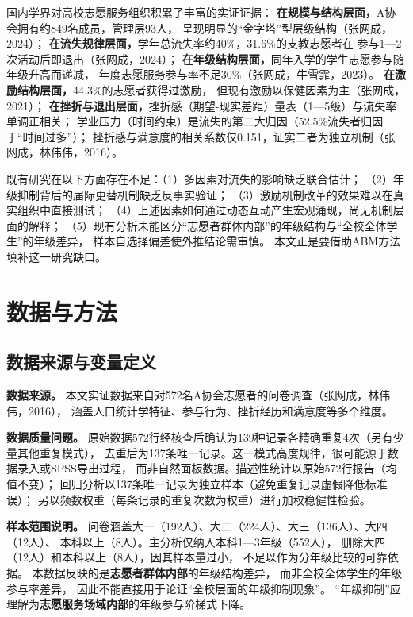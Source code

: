 \documentclass[12pt,a4paper]{article}
\begin{document}
国内学界对高校志愿服务组织积累了丰富的实证证据：
\textbf{在规模与结构层面，}A协会拥有约849名成员，管理层93人，
呈现明显的“金字塔”型层级结构（张网成，2024）；
\textbf{在流失规律层面，}学年总流失率约40\%，31.6\%的支教志愿者在
参与1—2次活动后即退出（张网成，2024）；
\textbf{在年级结构层面，}同年入学的学生志愿参与随年级升高而递减，
年度志愿服务参与率不足30\%（张网成，牛雪霏，2023）。
\textbf{在激励结构层面，}44.3\%的志愿者获得过激励，
但现有激励以保健因素为主（张网成，2021）；
\textbf{在挫折与退出层面，}挫折感（期望-现实差距）量表（1—5级）与流失率单调正相关；
学业压力（时间约束）是流失的第二大归因（52.5\%流失者归因于“时间过多”）；
挫折感与满意度的相关系数仅0.151，证实二者为独立机制（张网成，林伟伟，2016）。

既有研究在以下方面存在不足：（1）多因素对流失的影响缺乏联合估计；
（2）年级抑制背后的届际更替机制缺乏反事实验证；
（3）激励机制改革的效果难以在真实组织中直接测试；
（4）上述因素如何通过动态互动产生宏观涌现，尚无机制层面的解释；
（5）现有分析未能区分“志愿者群体内部”的年级结构与“全校全体学生”的年级差异，
样本自选择偏差使外推结论需审慎。
本文正是要借助ABM方法填补这一研究缺口。

\section{数据与方法}

\subsection{数据来源与变量定义}

\textbf{数据来源。}
本文实证数据来自对572名A协会志愿者的问卷调查（张网成，林伟伟，2016），
涵盖人口统计学特征、参与行为、挫折经历和满意度等多个维度。

\textbf{数据质量问题。}
原始数据572行经核查后确认为139种记录各精确重复4次（另有少量其他重复模式），
去重后为137条唯一记录。这一模式高度规律，很可能源于数据录入或SPSS导出过程，
而非自然面板数据。描述性统计以原始572行报告（均值不变）；
回归分析以137条唯一记录为独立样本（避免重复记录虚假降低标准误）；
另以频数权重（每条记录的重复次数为权重）进行加权稳健性检验。

\textbf{样本范围说明。}
问卷涵盖大一（192人）、大二（224人）、大三（136人）、大四（12人）、
本科以上（8人）。主分析仅纳入本科1—3年级（552人），
删除大四（12人）和本科以上（8人），因其样本量过小，
不足以作为分年级比较的可靠依据。
本数据反映的是\textbf{志愿者群体内部}的年级结构差异，
而非全校全体学生的年级参与率差异，
因此不能直接用于论证“全校层面的年级抑制现象”。
“年级抑制”应理解为\textbf{志愿服务场域内部}的年级参与阶梯式下降。
\end{document}

